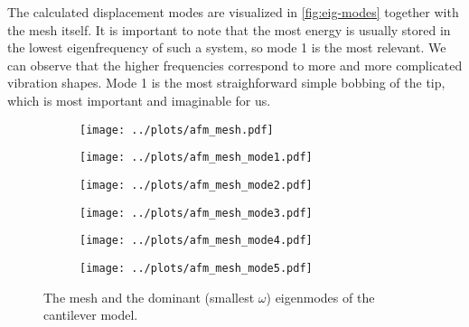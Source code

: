 \documentclass{article}
\begin{document}
The calculated displacement modes are visualized in \autoref{fig:eig-modes} together with the mesh itself. It is important to note that the most energy is usually stored in the lowest eigenfrequency of such a system, so mode 1 is the most relevant. 
We can observe that the higher frequencies correspond to more and more complicated vibration shapes. Mode 1 is the most straighforward simple bobbing of the tip, which is most important and imaginable for us.

\begin{figure}[h!]
	\centering
	\begin{subfigure}{0.35\textheight}
		\centering
		\texttt{[image: ../plots/afm\_mesh.pdf]}
	\end{subfigure}
	\begin{subfigure}{0.35\textheight}
		\centering
		\texttt{[image: ../plots/afm\_mesh\_mode1.pdf]}
	\end{subfigure}
	
	\begin{subfigure}{0.35\textheight}
		\centering
		\texttt{[image: ../plots/afm\_mesh\_mode2.pdf]}
	\end{subfigure}\begin{subfigure}{0.35\textheight}
	\centering
	\texttt{[image: ../plots/afm\_mesh\_mode3.pdf]}
	\end{subfigure}
	
	\begin{subfigure}{0.35\textheight}
		\centering
		\texttt{[image: ../plots/afm\_mesh\_mode4.pdf]}
	\end{subfigure}\begin{subfigure}{0.35\textheight}
	\centering
	\texttt{[image: ../plots/afm\_mesh\_mode5.pdf]}
	\end{subfigure}
	
	\caption{The mesh and the dominant (smallest $\omega$) eigenmodes of the cantilever model.}\label{fig:eig-modes}
\end{figure}

\FloatBarrier
\newpage
\printbibliography
\end{document}
